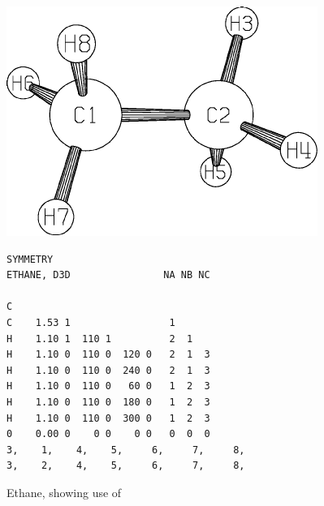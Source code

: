 \begin{figure}
\begin{makeimage}
\end{makeimage}
\begin{center}
\includegraphics{picc2h6}
\end{center}

\begin{verbatim}
SYMMETRY
ETHANE, D3D                NA NB NC

C
C    1.53 1                 1
H    1.10 1  110 1          2  1
H    1.10 0  110 0  120 0   2  1  3
H    1.10 0  110 0  240 0   2  1  3
H    1.10 0  110 0   60 0   1  2  3
H    1.10 0  110 0  180 0   1  2  3
H    1.10 0  110 0  300 0   1  2  3
0    0.00 0    0 0    0 0   0  0  0
3,    1,    4,    5,     6,     7,     8,
3,    2,    4,    5,     6,     7,     8,
\end{verbatim}
\caption{\label{c2h6} Ethane, showing use of }
\end{figure}


